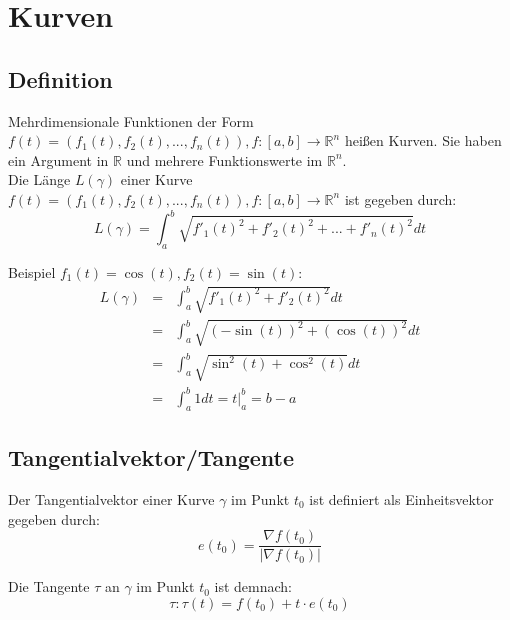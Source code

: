 
\section{Kurven}
\label{sec:kurven}

\subsection{Definition}
\label{sub:definition-kurven}

Mehrdimensionale Funktionen der Form $f(t) = (f_1(t),f_2(t),...,f_n(t)), f:[a,b] \rightarrow \mathbb{R}^n$ heißen Kurven.
Sie haben ein Argument in $\mathbb{R}$ und mehrere Funktionswerte im $\mathbb{R}^n$.
\\
Die Länge $L(\gamma)$ einer Kurve $f(t) = (f_1(t),f_2(t),...,f_n(t)), f:[a,b] \rightarrow \mathbb{R}^n$ ist gegeben durch:
\begin{equation}
	L(\gamma) = \int_a^b \sqrt{f'_1(t)^2 + f'_2(t)^2 + ... + f'_n(t)^2}dt
\end{equation}

Beispiel $f_1(t) = \cos(t), f_2(t) = \sin(t)$:
\begin{eqnarray*}
	L(\gamma) &=& \int_a^b \sqrt{f'_1(t)^2 + f'_2(t)^2}dt\\
	&=& \int_a^b \sqrt{(-\sin(t))^2 + (\cos(t))^2}dt\\
	&=& \int_a^b \sqrt{\sin^2(t) + \cos^2(t)}dt\\
	&=& \int_a^b 1dt = t|_a^b = b - a
\end{eqnarray*}


\subsection{Tangentialvektor/Tangente}
\label{sub:tangentialvektor_tangente}

Der Tangentialvektor einer Kurve $\gamma$ im Punkt $t_0$ ist definiert als Einheitsvektor gegeben durch: 
\begin{equation}
	e(t_0) = \frac{\nabla f(t_0)}{|\nabla f(t_0)|}
\end{equation}

Die Tangente $\tau$ an $\gamma$ im Punkt $t_0$ ist demnach:
\begin{equation}
	\tau : \tau(t) = f(t_0) +  t \cdot e(t_0)
\end{equation}

